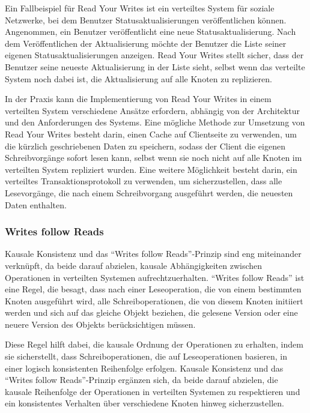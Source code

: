 \documentclass[../vs-script-first-v01.tex]{subfiles}
\begin{document}
Ein Fallbeispiel für Read Your Writes ist ein verteiltes System für soziale Netzwerke, bei dem Benutzer Statusaktualisierungen veröffentlichen können. Angenommen, ein Benutzer veröffentlicht eine neue Statusaktualisierung. Nach dem Veröffentlichen der Aktualisierung möchte der Benutzer die Liste seiner eigenen Statusaktualisierungen anzeigen. Read Your Writes stellt sicher, dass der Benutzer seine neueste Aktualisierung in der Liste sieht, selbst wenn das verteilte System noch dabei ist, die Aktualisierung auf alle Knoten zu replizieren.

In der Praxis kann die Implementierung von Read Your Writes in einem verteilten System verschiedene Ansätze erfordern, abhängig von der Architektur und den Anforderungen des Systems. Eine mögliche Methode zur Umsetzung von Read Your Writes besteht darin, einen Cache auf Clientseite zu verwenden, um die kürzlich geschriebenen Daten zu speichern, sodass der Client die eigenen Schreibvorgänge sofort lesen kann, selbst wenn sie noch nicht auf alle Knoten im verteilten System repliziert wurden. Eine weitere Möglichkeit besteht darin, ein verteiltes Transaktionsprotokoll zu verwenden, um sicherzustellen, dass alle Lesevorgänge, die nach einem Schreibvorgang ausgeführt werden, die neuesten Daten enthalten.

\subsubsection{Writes follow Reads}
Kausale Konsistenz und das \enquote{Writes follow Reads}-Prinzip sind eng miteinander verknüpft, da beide darauf abzielen, kausale Abhängigkeiten zwischen Operationen in verteilten Systemen aufrechtzuerhalten. \enquote{Writes follow Reads} ist eine Regel, die besagt, dass nach einer Leseoperation, die von einem bestimmten Knoten ausgeführt wird, alle Schreiboperationen, die von diesem Knoten initiiert werden und sich auf das gleiche Objekt beziehen, die gelesene Version oder eine neuere Version des Objekts berücksichtigen müssen.

Diese Regel hilft dabei, die kausale Ordnung der Operationen zu erhalten, indem sie sicherstellt, dass Schreiboperationen, die auf Leseoperationen basieren, in einer logisch konsistenten Reihenfolge erfolgen. Kausale Konsistenz und das \enquote{Writes follow Reads}-Prinzip ergänzen sich, da beide darauf abzielen, die kausale Reihenfolge der Operationen in verteilten Systemen zu respektieren und ein konsistentes Verhalten über verschiedene Knoten hinweg sicherzustellen.
\end{document}
